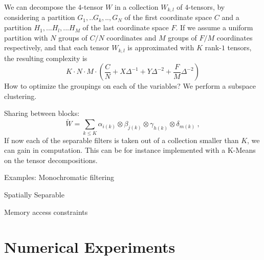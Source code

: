 \documentclass{article}
\begin{document}
We can decompose the $4$-tensor $W$ in a collection $W_{k,l}$ of $4$-tensors, 
by considering a partition $G_1,..G_k,..,G_N$ of the first coordinate space $C$ and
a partition $H_1,...H_l,...H_M$ of the last coordinate space $F$. 
 If we assume a uniform partition with $N$ groups of $C/N$ coordinates and 
 $M$ groups of $F/M$ coordinates respectively, and that each tensor $W_{k,l}$ 
 is approximated with $K$ rank-$1$ tensors, the resulting complexity is 
\begin{equation*}
 K \cdot N \cdot M \cdot \left( \frac{C}{N} + X \Delta^{-1} + Y \Delta^{-2} + \frac{F}{M} \Delta^{-2}\right)
\end{equation*}
 How to optimize the groupings on each of the variables? We perform a subspace clustering. 
 
 
 Sharing between blocks: 
\begin{equation}
\label{rankoptim}
 \widetilde{W} = \sum_{k\leq K} \alpha_{i(k)} \otimes \beta_{j(k)} \otimes \gamma_{h(k)} \otimes \delta_{m(k)}~,
\end{equation}
If now each of the separable filters is taken out of a collection smaller than $K$, we can gain 
in computation. This can be for instance implemented with a K-Means on the tensor decompositions.


Examples:
Monochromatic filtering

Spatially Separable

Memory access constraints


\section{Numerical Experiments}
\end{document}
